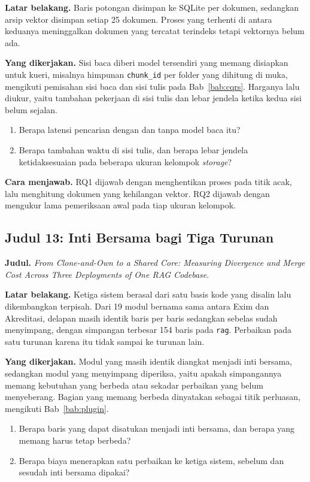 \textbf{Latar belakang.} Baris potongan disimpan ke SQLite per dokumen,
sedangkan arsip vektor disimpan setiap 25 dokumen. Proses yang terhenti di
antara keduanya meninggalkan dokumen yang tercatat terindeks tetapi vektornya
belum ada.

\textbf{Yang dikerjakan.} Sisi baca diberi model tersendiri yang memang
disiapkan untuk kueri, misalnya himpunan \texttt{chunk\_id} per folder yang
dihitung di muka, mengikuti pemisahan sisi baca dan sisi tulis pada
Bab~\ref{bab:cqrs}. Harganya lalu diukur, yaitu tambahan pekerjaan di sisi
tulis dan lebar jendela ketika kedua sisi belum sejalan.

\begin{enumerate}
  \item Berapa latensi pencarian dengan dan tanpa model baca itu?
  \item Berapa tambahan waktu di sisi tulis, dan berapa lebar jendela
    ketidaksesuaian pada beberapa ukuran kelompok \textit{storage}?
\end{enumerate}

\textbf{Cara menjawab.} RQ1 dijawab dengan menghentikan proses pada titik
acak, lalu menghitung dokumen yang kehilangan vektor. RQ2 dijawab dengan
mengukur lama pemeriksaan awal pada tiap ukuran kelompok.

\subsection*{Judul 13: Inti Bersama bagi Tiga Turunan}

\textbf{Judul.} \textit{From Clone-and-Own to a Shared Core: Measuring
Divergence and Merge Cost Across Three Deployments of One RAG Codebase}.

\textbf{Latar belakang.} Ketiga sistem berasal dari satu basis kode yang
disalin lalu dikembangkan terpisah. Dari 19 modul bernama sama antara Exim dan
Akreditasi, delapan masih identik baris per baris sedangkan sebelas sudah
menyimpang, dengan simpangan terbesar 154 baris pada \texttt{rag}. Perbaikan
pada satu turunan karena itu tidak sampai ke turunan lain.

\textbf{Yang dikerjakan.} Modul yang masih identik diangkat menjadi inti
bersama, sedangkan modul yang menyimpang diperiksa, yaitu apakah simpangannya
memang kebutuhan yang berbeda atau sekadar perbaikan yang belum menyeberang.
Bagian yang memang berbeda dinyatakan sebagai titik perluasan, mengikuti
Bab~\ref{bab:plugin}.

\begin{enumerate}
  \item Berapa baris yang dapat disatukan menjadi inti bersama, dan berapa
    yang memang harus tetap berbeda?
  \item Berapa biaya menerapkan satu perbaikan ke ketiga sistem, sebelum dan
    sesudah inti bersama dipakai?
\end{enumerate}

